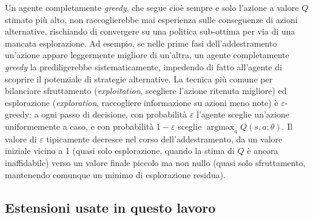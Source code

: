 Un agente completamente \emph{greedy}, che segue cioè sempre e solo l'azione a valore $Q$ stimato più
alto, non raccoglierebbe mai esperienza sulle conseguenze di azioni
alternative, rischiando di convergere su una politica sub-ottima per via
di una mancata esplorazione. Ad esempio, se nelle prime fasi
dell'addestramento un'azione appare leggermente migliore di un'altra, un
agente completamente \emph{greedy} la prediligerebbe sistematicamente,
impedendo di fatto all'agente di scoprire il potenziale di strategie alternative.
La tecnica più comune per bilanciare sfruttamento (\emph{exploitation}, scegliere
l'azione ritenuta migliore) ed esplorazione (\emph{exploration},
raccogliere informazione su azioni meno note) è $\varepsilon$-greedy: a
ogni passo di decisione, con probabilità $\varepsilon$ l'agente sceglie
un'azione uniformemente a caso, e con probabilità $1-\varepsilon$ sceglie
$\operatorname*{argmax}_a Q(s,a;\theta)$. Il valore di $\varepsilon$
tipicamente decresce nel corso dell'addestramento, da un valore iniziale
vicino a 1 (quasi solo esplorazione, quando la stima di $Q$ è ancora
inaffidabile) verso un valore finale piccolo ma non nullo (quasi solo
sfruttamento, mantenendo comunque un minimo di esplorazione residua).

\subsection{Estensioni usate in questo lavoro}

